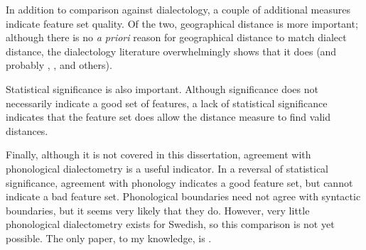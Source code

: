 In addition to comparison against dialectology, a couple of additional
measures indicate feature set quality. Of the two, geographical
distance is more important; although there is no {\it a priori} reason
for geographical distance to match dialect distance, the dialectology
literature overwhelmingly shows that it does \cite{gooskens04a} (and
probably \cite{heeringa04}, \cite{kondrak02}, and others).

Statistical significance is also important. Although significance does not
necessarily indicate a good set of features, a lack of statistical
significance indicates that the feature set does allow the distance
measure to find valid distances.

Finally, although it is not covered in this dissertation, agreement
with phonological dialectometry is a useful indicator. In a reversal
of statistical significance, agreement with phonology indicates a good
feature set, but cannot indicate a bad feature set. Phonological
boundaries need not agree with syntactic boundaries, but it seems very
likely that they do. However, very little phonological dialectometry
exists for Swedish, so this comparison is not yet possible. The only
paper, to my knowledge, is .


